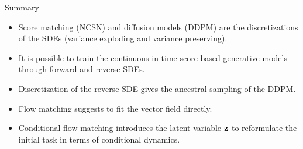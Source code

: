 \begin{frame}{Summary}
	\begin{itemize}
		\item Score matching (NCSN) and diffusion models (DDPM) are the discretizations of the SDEs (variance exploding and variance preserving).
		\vfill
		\item It is possible to train the continuous-in-time score-based generative models through forward and reverse SDEs.
		\vfill
		\item Discretization of the reverse SDE gives the ancestral sampling of the DDPM.
		\vfill
		\item Flow matching suggests to fit the vector field directly.
		\vfill 
		\item Conditional flow matching introduces the latent variable $\mathbf{z}$ to reformulate the initial task in terms of conditional dynamics.
	\end{itemize}
\end{frame}
 